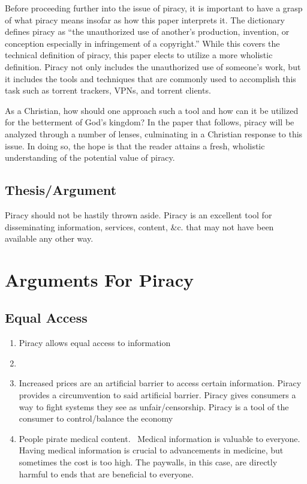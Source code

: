 \documentclass[onecolumn, 12pt]{article}
\begin{document}
Before proceeding further into the issue of piracy, it is important to have a grasp of
what piracy means insofar as how this paper interprets it. The dictionary defines piracy
as ``the unauthorized use of another's production, invention, or conception especially in
infringement of a copyright.'' While this covers the technical definition of piracy, this
paper elects to utilize a more wholistic definition. Piracy not only includes the
unauthorized use of someone's work, but it includes the tools and techniques that are
commonly used to accomplish this task such as torrent trackers, VPNs, and torrent clients.

As a Christian, how should one approach such a tool and how can it be utilized for the
betterment of God's kingdom? In the paper that follows, piracy will be analyzed through a
number of lenses, culminating in a Christian response to this issue. In doing so, the hope
is that the reader attains a fresh, wholistic understanding of the potential value of
piracy.

\subsection{Thesis/Argument}

Piracy should not be hastily thrown aside.
Piracy is an excellent tool for disseminating information, services, content,
\&c. that may not have been available any other way.

\section{Arguments For Piracy}

\subsection{Equal Access}

\begin{enumerate}
  \item Piracy allows equal access to information
  \item {}

  \item Increased prices are an artificial barrier to access certain
    information. Piracy provides a circumvention to said artificial barrier.
    Piracy gives consumers a way to fight systems they see as
    unfair/censorship. Piracy is a tool of the consumer to control/balance the
    economy~\cite{darnton:pirating-and-publishing, bohannon:everyone}

  \item People pirate medical content.~\cite{till:medical-literature}
    Medical information is valuable to everyone. Having medical information is
    crucial to advancements in medicine, but sometimes the cost is too high.
    The paywalls, in this case, are directly harmful to ends that are
    beneficial to everyone.
\end{enumerate}
\end{document}
